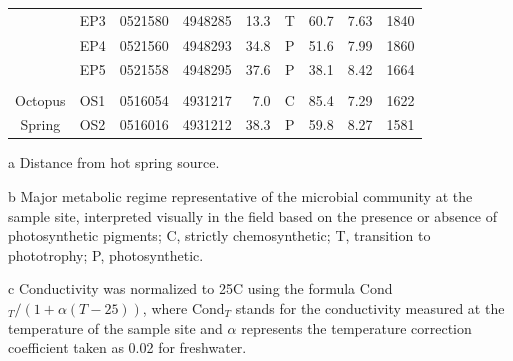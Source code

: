 {\begin{table}[htbp]
\begin{adjustbox}{width=\textwidth,keepaspectratio}
\begin{threeparttable}
\begin{tabular}{clccrcccc}
      & EP3   & 0521580 & 4948285 & 13.3  & T     & 60.7  & 7.63  & 1840 \\
      & EP4   & 0521560 & 4948293 & 34.8  & P     & 51.6  & 7.99  & 1860 \\
      & EP5   & 0521558 & 4948295 & 37.6  & P     & 38.1  & 8.42  & 1664 \\
      &       &       &       &       &       &       &       &  \\
Octopus & OS1   & 0516054 & 4931217 & 7.0   & C     & 85.4  & 7.29  & 1622 \\
Spring & OS2   & 0516016 & 4931212 & 38.3  & P     & 59.8  & 8.27  & 1581 \\
\bottomrule
\end{tabular}%

    \begin{tablenotes}
      \small
      \item[a] Distance from hot spring source.
      \item[b] Major metabolic regime representative of the microbial community at the sample site, interpreted visually in the field based on the presence or absence of photosynthetic pigments; C, strictly chemosynthetic; T, transition to phototrophy; P, photosynthetic.
      \item[c] Conductivity was normalized to 25\degree C using the formula Cond$_{T}/(1+\alpha(T-25))$, where Cond$_{T}$ stands for the conductivity measured at the temperature of the sample site and $\alpha$ represents the temperature correction coefficient taken as 0.02 for freshwater.
    \end{tablenotes}
  \label{tab:geophysical}%
  \end{threeparttable}
  \end{adjustbox}
\end{table}%
\doublespace
\clearpage
}





